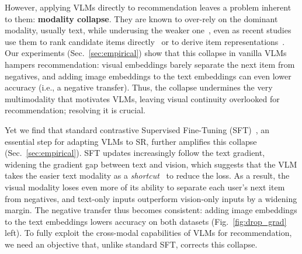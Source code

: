 However, applying VLMs directly to recommendation leaves a problem inherent to them: \textbf{modality collapse}.
They are known to over-rely on the dominant modality, usually text, while underusing the weaker one~\cite{modality_bias1,modality_gap_gen1}, even as recent studies use them to rank candidate items directly~\cite{mllmmsr,hanorec} or to derive item representations~\cite{notellm2,vlm_prompt}.
Our experiments (Sec.~\ref{sec:empirical}) show that this collapse in vanilla VLMs hampers recommendation: visual embeddings barely separate the next item from negatives, and adding image embeddings to the text embeddings can even lower accuracy (i.e., a negative transfer).
Thus, the collapse undermines the very multimodality that motivates VLMs, leaving visual continuity overlooked for recommendation; resolving it is crucial.

Yet we find that standard contrastive Supervised Fine-Tuning (SFT)~\cite{infonce1}, an essential step for adapting VLMs to SR, further amplifies this collapse (Sec.~\ref{sec:empirical}).
SFT updates increasingly follow the text gradient, widening the gradient gap between text and vision, which suggests that the VLM takes the easier text modality as a \textit{shortcut}~\cite{shortcut2} to reduce the loss.
As a result, the visual modality loses even more of its ability to separate each user's next item from negatives, and text-only inputs outperform vision-only inputs by a widening margin.
The negative transfer thus becomes consistent: adding image embeddings to the text embeddings lowers accuracy on both datasets (Fig.~\ref{fig:drop_grad} left).
To fully exploit the cross-modal capabilities of VLMs for recommendation, we need an objective that, unlike standard SFT, corrects this collapse.

